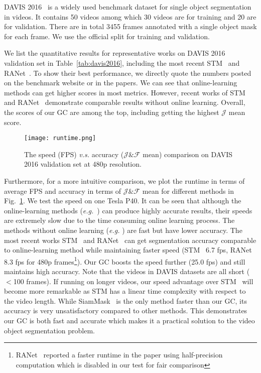 \documentclass[runningheads]{llncs}
\begin{document}
DAVIS 2016~\cite{davis2016} is a widely used benchmark dataset for single object segmentation in videos. It contains 50 videos among which 30 videos are for training and 20 are for validation. There are in total 3455 frames annotated with a single object mask for each frame. We use the official split for training and validation.

We list the quantitative results for representative works on DAVIS 2016 validation set in Table~\ref{tab:davis2016}, including the most recent STM~\cite{stm} and RANet~\cite{ranet}. To show their best performance, we directly quote the numbers posted on the benchmark website or in the papers. We can see that online-learning methods can get higher scores in most metrics. However, recent works of STM~\cite{stm} and RANet~\cite{ranet} demonstrate comparable results without online learning. Overall, the scores of our GC are among the top, including getting the highest $\mathcal{J}$ mean score.


\begin{figure}[tb]
    \centering
    \texttt{[image: runtime.png]}
    \caption{The speed (FPS) \textit{v.s.} accuracy ($\mathcal{J} \& \mathcal{F}$ mean) comparison on DAVIS 2016 validation set at 480p resolution.}
    \label{fig:runtime}
\end{figure}

Furthermore, for a more intuitive comparison, we plot the runtime in terms of average FPS and accuracy in terms of $\mathcal{J} \& \mathcal{F}$ mean for different methods in Fig.~\ref{fig:runtime}. We test the speed on one Tesla P40. It can be seen that although the online-learning methods (\textit{e.g.}~\cite{cinm,premvos,osvoss}) can produce highly accurate results, their speeds are extremely slow due to the time consuming online learning process. The methods without online learning (\textit{e.g.} \cite{pml,rgmp,osmn}) are fast but have lower accuracy. The most recent works STM~\cite{stm} and RANet~\cite{ranet} can get segmentation accuracy comparable to online-learning method while maintaining faster speed (STM~\cite{stm} 6.7 fps, RANet~\cite{ranet} 8.3 fps for 480p frames\footnote{RANet~\cite{ranet} reported a faster runtime in the paper using half-precision computation which is disabled in our test for fair comparison}). Our GC boosts the speed further (25.0 fps) and still maintains high accuracy. Note that the videos in DAVIS datasets are all short ($<$100 frames). If running on longer videos, our speed advantage over STM~\cite{stm} will become more remarkable as STM has a linear time complexity with respect to the video length. While SiamMask~\cite{siammask} is the only method faster than our GC, its accuracy is very unsatisfactory compared to other methods. This demonstrates our GC is both fast and accurate which makes it a practical solution to the video object segmentation problem.
\end{document}
